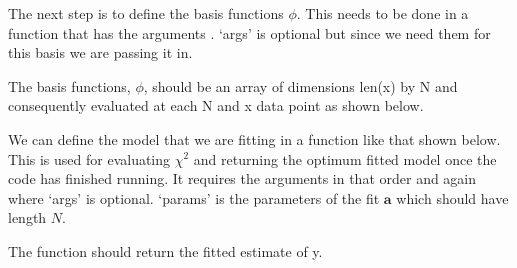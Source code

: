 \documentclass[letterpaper,10pt,english]{sphinxmanual}
\begin{document}
The next step is to define the basis functions \({\phi}\). This needs to be
done in a function that has the arguments . ‘args’
is optional but since we need them for this basis we are passing it in.

The basis functions, \({\phi}\), should be an array of dimensions len(x)
by N and consequently evaluated at each N and x data point as shown below.

\begin{sphinxVerbatim}[commandchars=\\\{\}]
     

      \PYG{p}{[} \PYG{p}{]}
       
           
            \PYG{p}{[} \PYG{p}{]}  \PYG{p}{[}\PYG{p}{]}\PYG{p}{[}\PYG{p}{]}\PYG{p}{[}\PYG{p}{]}

     
\end{sphinxVerbatim}

We can define the model that we are fitting in a function like that shown below.
This is used for evaluating \({\chi^2}\) and returning the optimum fitted model
once the code has finished running. It requires the arguments
 in that order and again where ‘args’ is optional.
‘params’ is the parameters of the fit \({\mathbf{a}}\) which should have length
\({N}\).

The function should return the fitted estimate of y.

\begin{sphinxVerbatim}[commandchars=\\\{\}]
      

      \PYG{p}{[}\PYG{p}{]}\PYG{p}{[}
        \PYG{p}{[}\PYG{p}{]}\PYG{p}{[}\PYG{p}{]}
           \PYG{p}{]} 

     
\end{sphinxVerbatim}
\end{document}
